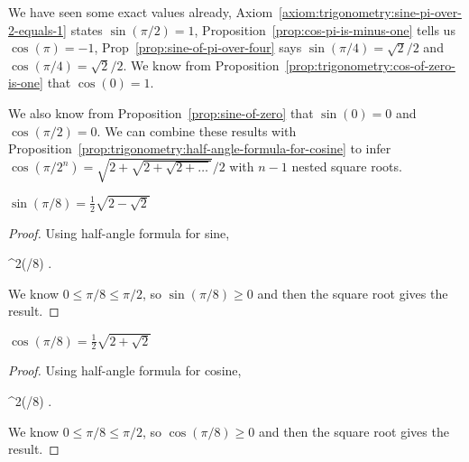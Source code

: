 We have seen some exact values already, Axiom~\ref{axiom:trigonometry:sine-pi-over-2-equals-1}
states $\sin(\pi/2)=1$, Proposition~\ref{prop:cos-pi-is-minus-one}
tells us $\cos(\pi)=-1$, Prop~\ref{prop:sine-of-pi-over-four}
says $\sin(\pi/4)=\sqrt{2}/2$ and $\cos(\pi/4)=\sqrt{2}/2$. We know from Proposition~\ref{prop:trigonometry:cos-of-zero-is-one}
that $\cos(0)=1$.

We also know from Proposition~\ref{prop:sine-of-zero} that $\sin(0)=0$
and $\cos(\pi/2)=0$. We can combine these results with Proposition~\ref{prop:trigonometry:half-angle-formula-for-cosine} to infer
$\cos(\pi/2^{n}) = \sqrt{2 + \sqrt{2 + \sqrt{2 + \dots}}}/2$ with $n-1$
nested square roots.

\begin{proposition}
$\displaystyle{\sin(\pi/8) = \frac{1}{2}\sqrt{2 - \sqrt{2}}}$
\end{proposition}

\begin{proof}
Using half-angle formula for sine,
\begin{calculation}
  \sin^{2}(\pi/8)
  .
\end{calculation}
We know $0\leq\pi/8\leq\pi/2$, so $\sin(\pi/8)\geq 0$ and then the
square root gives the result.
\end{proof}

\begin{proposition}\label{prop:cosine-of-pi-over-eight}
$\displaystyle{\cos(\pi/8) = \frac{1}{2}\sqrt{2 + \sqrt{2}}}$
\end{proposition}

\begin{proof}
Using half-angle formula for cosine,
\begin{calculation}
  \cos^{2}(\pi/8)
  .
\end{calculation}
We know $0\leq\pi/8\leq\pi/2$, so $\cos(\pi/8)\geq 0$ and then the
square root gives the result.
\end{proof}

